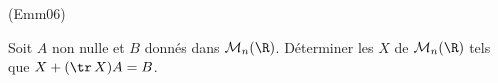 \begin{tiny}(Emm06)\end{tiny}
Soit $A$ non nulle et $B$ donn{\'e}s dans $\mathcal{M}_{n}(\R)$. D{\'e}terminer les $X$ de $\mathcal{M}_{n}(\R)$ tels que $X+(\tr \,X)A=B$.